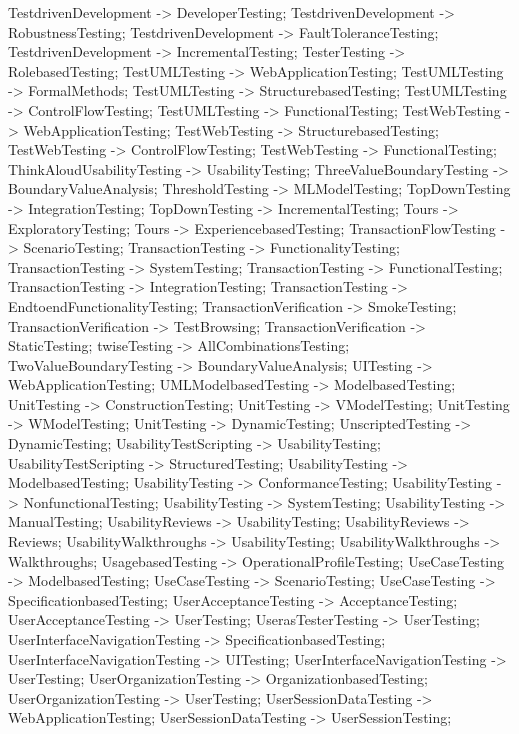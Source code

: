 \documentclass{article}
\begin{document}
{TestdrivenDevelopment -> DeveloperTesting;
TestdrivenDevelopment -> RobustnessTesting;
TestdrivenDevelopment -> FaultToleranceTesting;
TestdrivenDevelopment -> IncrementalTesting;
TesterTesting -> RolebasedTesting;
TestUMLTesting -> WebApplicationTesting;
TestUMLTesting -> FormalMethods;
TestUMLTesting -> StructurebasedTesting;
TestUMLTesting -> ControlFlowTesting;
TestUMLTesting -> FunctionalTesting;
TestWebTesting -> WebApplicationTesting;
TestWebTesting -> StructurebasedTesting;
TestWebTesting -> ControlFlowTesting;
TestWebTesting -> FunctionalTesting;
ThinkAloudUsabilityTesting -> UsabilityTesting;
ThreeValueBoundaryTesting -> BoundaryValueAnalysis;
ThresholdTesting -> MLModelTesting;
TopDownTesting -> IntegrationTesting;
TopDownTesting -> IncrementalTesting;
Tours -> ExploratoryTesting;
Tours -> ExperiencebasedTesting;
TransactionFlowTesting -> ScenarioTesting;
TransactionTesting -> FunctionalityTesting;
TransactionTesting -> SystemTesting;
TransactionTesting -> FunctionalTesting;
TransactionTesting -> IntegrationTesting;
TransactionTesting -> EndtoendFunctionalityTesting;
TransactionVerification -> SmokeTesting;
TransactionVerification -> TestBrowsing;
TransactionVerification -> StaticTesting;
twiseTesting -> AllCombinationsTesting;
TwoValueBoundaryTesting -> BoundaryValueAnalysis;
UITesting -> WebApplicationTesting;
UMLModelbasedTesting -> ModelbasedTesting;
UnitTesting -> ConstructionTesting;
UnitTesting -> VModelTesting;
UnitTesting -> WModelTesting;
UnitTesting -> DynamicTesting;
UnscriptedTesting -> DynamicTesting;
UsabilityTestScripting -> UsabilityTesting;
UsabilityTestScripting -> StructuredTesting;
UsabilityTesting -> ModelbasedTesting;
UsabilityTesting -> ConformanceTesting;
UsabilityTesting -> NonfunctionalTesting;
UsabilityTesting -> SystemTesting;
UsabilityTesting -> ManualTesting;
UsabilityReviews -> UsabilityTesting;
UsabilityReviews -> Reviews;
UsabilityWalkthroughs -> UsabilityTesting;
UsabilityWalkthroughs -> Walkthroughs;
UsagebasedTesting -> OperationalProfileTesting;
UseCaseTesting -> ModelbasedTesting;
UseCaseTesting -> ScenarioTesting;
UseCaseTesting -> SpecificationbasedTesting;
UserAcceptanceTesting -> AcceptanceTesting;
UserAcceptanceTesting -> UserTesting;
UserasTesterTesting -> UserTesting;
UserInterfaceNavigationTesting -> SpecificationbasedTesting;
UserInterfaceNavigationTesting -> UITesting;
UserInterfaceNavigationTesting -> UserTesting;
UserOrganizationTesting -> OrganizationbasedTesting;
UserOrganizationTesting -> UserTesting;
UserSessionDataTesting -> WebApplicationTesting;
UserSessionDataTesting -> UserSessionTesting;
}
\end{document}
